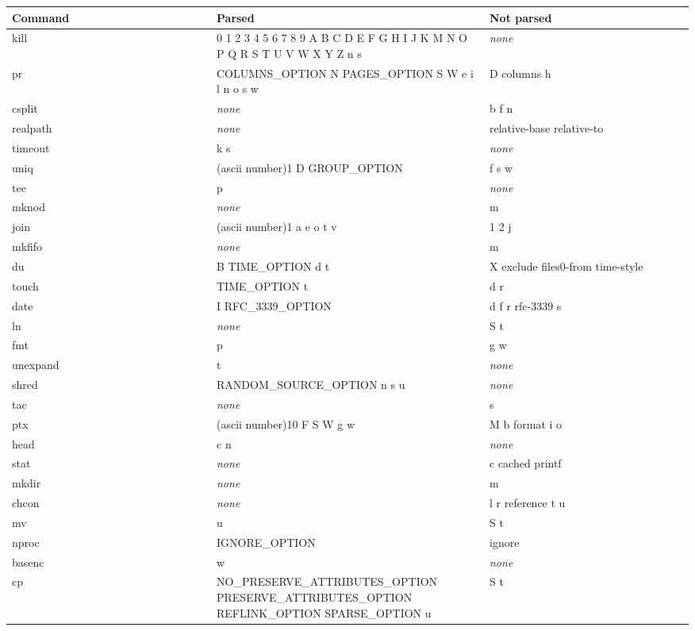 \begin{longtable}{|p{0.3\linewidth}|p{0.4\linewidth}|p{0.3\linewidth}|}
\hline
Command& Parsed& Not parsed\\
\hline
\hline
kill & 0 1 2 3 4 5 6 7 8 9 A B C D E F G H I J K M N O P Q R S T U V W X Y Z n s &  \textit{none}\\ 
\hline
pr & COLUMNS\_OPTION N PAGES\_OPTION S W e i l n o s w & D columns h\\ 
\hline
csplit &  \textit{none} &b f n\\ 
\hline
realpath &  \textit{none} &relative-base relative-to\\ 
\hline
timeout & k s &  \textit{none}\\ 
\hline
uniq & (ascii number)1 D GROUP\_OPTION & f s w\\ 
\hline
tee & p &  \textit{none}\\ 
\hline
mknod &  \textit{none} &m\\ 
\hline
join & (ascii number)1 a e o t v & 1 2 j\\ 
\hline
mkfifo &  \textit{none} &m\\ 
\hline
du & B TIME\_OPTION d t & X exclude files0-from time-style\\ 
\hline
touch & TIME\_OPTION t & d r\\ 
\hline
date & I RFC\_3339\_OPTION & d f r rfc-3339 s\\ 
\hline
ln &  \textit{none} &S t\\ 
\hline
fmt & p & g w\\ 
\hline
unexpand & t &  \textit{none}\\ 
\hline
shred & RANDOM\_SOURCE\_OPTION n s u &  \textit{none}\\ 
\hline
tac &  \textit{none} &s\\ 
\hline
ptx & (ascii number)10 F S W g w & M b format i o\\ 
\hline
head & c n &  \textit{none}\\ 
\hline
stat &  \textit{none} &c cached printf\\ 
\hline
mkdir &  \textit{none} &m\\ 
\hline
chcon &  \textit{none} &l r reference t u\\ 
\hline
mv & u & S t\\ 
\hline
nproc & IGNORE\_OPTION & ignore\\ 
\hline
basenc & w &  \textit{none}\\ 
\hline
cp & NO\_PRESERVE\_ATTRIBUTES\_OPTION PRESERVE\_ATTRIBUTES\_OPTION REFLINK\_OPTION SPARSE\_OPTION u & S t\\ 

\end{longtable}
